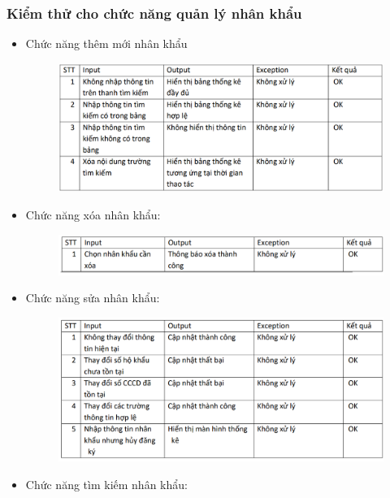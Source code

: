 \documentclass{article}
\begin{document}
\subsubsection{Kiểm thử cho chức năng quản lý nhân khẩu}
\begin{itemize}
    \item Chức năng thêm mới nhân khẩu
    \begin{figure}[H]
        \centering
        \includegraphics[width=1\textwidth]{Kiểm thử/Kiểm thử thêm nhân khẩu.png}
    \end{figure}
    \item Chức năng xóa nhân khẩu:
    \begin{figure}[H]
        \centering
        \includegraphics[width=1\textwidth]{Kiểm thử/KT xóa nhân khẩu.png}
    \end{figure}
    \newpage
    \item Chức năng sửa nhân khẩu:
    \begin{figure}[H]
        \centering
        \includegraphics[width=1\textwidth]{Kiểm thử/KT sửa nhân khẩu.png}
    \end{figure}
    \item Chức năng tìm kiếm nhân khẩu:
    \begin{figure}[H]

\end{figure}
\end{itemize}
\end{document}
